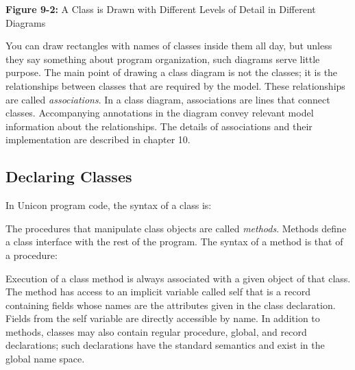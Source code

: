 {\sffamily\bfseries Figure 9-2:}
{\sffamily A Class is Drawn with Different Levels of Detail in
 Different Diagrams}

\bigskip

You can draw rectangles with names of classes inside them all day, but
unless they say something about program organization, such diagrams
serve little purpose. The main point of drawing a class diagram is not
the classes; it is the relationships between classes that are required
by the model. These relationships are called
\textit{associations}. In a class diagram,
associations are lines that connect classes. Accompanying annotations
in the diagram convey relevant model information about the
relationships. The details of associations and their implementation are
described in chapter 10.

\subsection[Declaring Classes]{Declaring Classes}
In Unicon program code, the syntax of a class
is: 


The procedures that manipulate class objects are called
\textit{methods}. Methods define a
class{\textquotesingle} interface with the rest of the program. The
syntax of a method is that of a procedure: 


Execution of a class method is always associated with a given object of
that class. The method has access to an implicit
variable called
\textsf{self} that is a record containing fields whose
names are the attributes given in the class declaration. Fields from
the \textsf{self} variable are directly accessible by name. In addition
to methods, classes may also contain regular procedure, global, and
record declarations; such declarations have the standard semantics and
exist in the global name space. 

